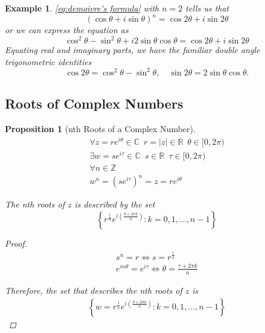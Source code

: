 \documentclass[11pt, oneside]{book}
\theoremstyle{break}
\newtheorem*{proof}{Proof}
\newtheorem{propo}{Proposition}[section]
\newtheorem{eg}{Example}[section]
\newcommand{\abs}[1]{\left|#1\right|}						%
\begin{document}
\begin{eg}
	\cref{eq:demoivre's formula} with $n = 2$ tells us that
	\begin{equation*}
		(\cos \theta + i \sin \theta)^n = \cos 2\theta + i \sin 2\theta
	\end{equation*}
	or we can express the equation as
	\begin{equation*}
		\cos^2 \theta - \sin^2 \theta + i2 \sin\theta \cos\theta = \cos 2\theta + i \sin 2\theta
	\end{equation*}
	Equating real and imaginary parts, we have the familiar double angle trigonometric identities
	\begin{equation*}
		\cos 2\theta = \cos^2 \theta - \sin^2 \theta, \quad \sin 2\theta = 2\sin\theta\cos\theta.
	\end{equation*}
\end{eg}

\subsection{Roots of Complex Numbers} %
\label{sub:roots_of_complex_numbers}

\begin{propo}[nth Roots of a Complex Number]\label{propo:nth Roots of a Complex Number}
	\begin{gather*}
		\forall z = re^{i\theta} \in \mathbb{C} \enspace r = \abs{z} \in \mathbb{R} \enspace \theta \in [0, 2\pi) \\
		\exists w = se^{i\tau} \in \mathbb{C} \enspace s \in \mathbb{R} \enspace \tau \in [0, 2\pi) \\
		\forall n \in \mathbb{Z} \\ 
		w^n = \left( se^{i\tau}\right)^n = z = re^{i\theta}
	\end{gather*}

	The nth roots of $z$ is described by the set
	\begin{equation}\label{eq:nth roots of a complex number}
		\left\{ r^{\frac{1}{n}} e^{i \left(\frac{\theta + 2 \pi k}{n} \right)} : k = 0, 1, ..., n - 1 \right\}
	\end{equation}

	\begin{proof}
		\begin{gather*}
			s^n = r \iff s = r^{\frac{1}{n}} \\
			e^{in\theta} = e^{i \tau} \iff \theta = \frac{\tau + 2 \pi k}{n}
		\end{gather*}

		Therefore, the set that describes the nth roots of $z$ is
		\begin{gather*}
			\left\{ w = r^\frac{1}{n} e^{i \left( \frac{\theta + 2 \pi k}{n} \right)} : k = 0, 1, ..., n - 1 \right\}
		\end{gather*}
	\end{proof}
\end{propo}
\end{document}
